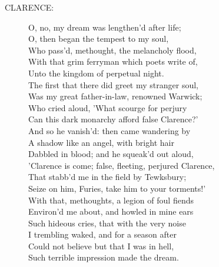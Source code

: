 \documentclass{article}
\begin{document}
\begin{description}
\item[CLARENCE:] 
\hspace{1pt}O, no, my dream was lengthen'd after life;\\
\hspace{1pt}O, then began the tempest to my soul,\\
\hspace{1pt}Who pass'd, methought, the melancholy flood,\\
\hspace{1pt}With that grim ferryman which poets write of,\\
\hspace{1pt}Unto the kingdom of perpetual night.\\
\hspace{1pt}The first that there did greet my stranger soul,\\
\hspace{1pt}Was my great father-in-law, renowned Warwick;\\
\hspace{1pt}Who cried aloud, 'What scourge for perjury\\
\hspace{1pt}Can this dark monarchy afford false Clarence?'\\
\hspace{1pt}And so he vanish'd: then came wandering by\\
\hspace{1pt}A shadow like an angel, with bright hair\\
\hspace{1pt}Dabbled in blood; and he squeak'd out aloud,\\
\hspace{1pt}'Clarence is come; false, fleeting, perjured Clarence,\\
\hspace{1pt}That stabb'd me in the field by Tewksbury;\\
\hspace{1pt}Seize on him, Furies, take him to your torments!'\\
\hspace{1pt}With that, methoughts, a legion of foul fiends\\
\hspace{1pt}Environ'd me about, and howled in mine ears\\
\hspace{1pt}Such hideous cries, that with the very noise\\
\hspace{1pt}I trembling waked, and for a season after\\
\hspace{1pt}Could not believe but that I was in hell,\\
\hspace{1pt}Such terrible impression made the dream.\\
\end{description}
\end{document}
